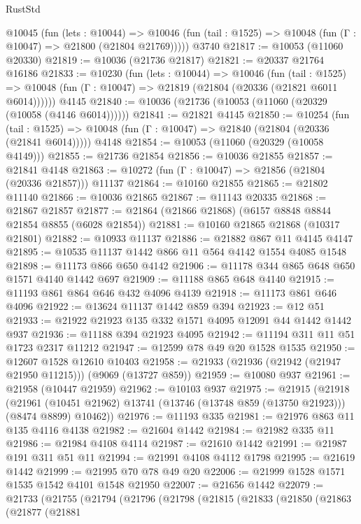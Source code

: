 \begin{lexlean}{RustStd}
\begin{coremodule}
{{    @10045
      (fun (lets : @10044) =>
      @10046 (fun (tail : @1525) => @10048 (fun (Γ : @10047) => @21800 (@21804 @21769)))))
    @3740
@21817 := @10053 (@11060 @20330)
@21819 := @10036 (@21736 @21817)
@21821 := @20337 @21764 @16186
@21833 := @10230
    (fun (lets : @10044) =>
    @10046
      (fun (tail : @1525) =>
      @10048 (fun (Γ : @10047) => @21819 (@21804 (@20336 (@21821 @6011 @6014))))))
    @4145
@21840 := @10036 (@21736 (@10053 (@11060 (@20329 (@10058 (@4146 @6014))))))
@21841 := @21821 @4145
@21850 := @10254
    (fun (tail : @1525) => @10048 (fun (Γ : @10047) => @21840 (@21804 (@20336 (@21841 @6014)))))
    @4148
@21854 := @10053 (@11060 (@20329 (@10058 @4149)))
@21855 := @21736 @21854
@21856 := @10036 @21855
@21857 := @21841 @4148
@21863 := @10272 (fun (Γ : @10047) => @21856 (@21804 (@20336 @21857))) @11137
@21864 := @10160 @21855
@21865 := @21802 @11140
@21866 := @10036 @21865
@21867 := @11143 @20335
@21868 := @21867 @21857
@21877 := @21864 (@21866 @21868) (@6157 @8848 @8844 @21854 @8855 (@6028 @21854))
@21881 := @10160 @21865 @21868 (@10317 @21801)
@21882 := @10933 @11137
@21886 := @21882 @867 @11 @4145 @4147
@21895 := @10535 @11137 @1442 @866 @11 @564 @4142 @1554 @4085 @1548
@21898 := @11173 @866 @650 @4142
@21906 := @11178 @344 @865 @648 @650 @1571 @4140 @1442 @697
@21909 := @11188 @865 @648 @4140
@21915 := @11193 @861 @864 @646 @432 @4096 @4139
@21918 := @11173 @861 @646 @4096
@21922 := @13624 @11137 @1442 @859 @394
@21923 := @12 @51
@21933 := @21922 @21923 @135 @332 @1571 @4095 @12091 @44 @1442 @1442 @937
@21936 := @11188 @394 @21923 @4095
@21942 := @11194 @311 @11 @51 @1723 @2317 @11212
@21947 := @12599 @78 @49 @20 @1528 @1535
@21950 := @12607 @1528 @12610 @10403
@21958 := @21933 (@21936 (@21942 (@21947 @21950 @11215))) (@9069 (@13727 @859))
@21959 := @10080 @937
@21961 := @21958 (@10447 @21959)
@21962 := @10103 @937
@21975 := @21915
    (@21918
      (@21961 (@10451 @21962) @13741 (@13746 (@13748 @859 (@13750 @21923))) (@8474 @8899) @10462))
@21976 := @11193 @335
@21981 := @21976 @863 @11 @135 @4116 @4138
@21982 := @21604 @1442
@21984 := @21982 @335 @11
@21986 := @21984 @4108 @4114
@21987 := @21610 @1442
@21991 := @21987 @191 @311 @51 @11
@21994 := @21991 @4108 @4112 @1798
@21995 := @21619 @1442
@21999 := @21995 @70 @78 @49 @20
@22006 := @21999 @1528 @1571 @1535 @1542 @4101 @1548 @21950
@22007 := @21656 @1442
@22079 := @21733
    (@21755
      (@21794
        (@21796
          (@21798
            (@21815
              (@21833
                (@21850
                  (@21863
                    (@21877
                      (@21881
}}
\end{coremodule}
\end{lexlean}
